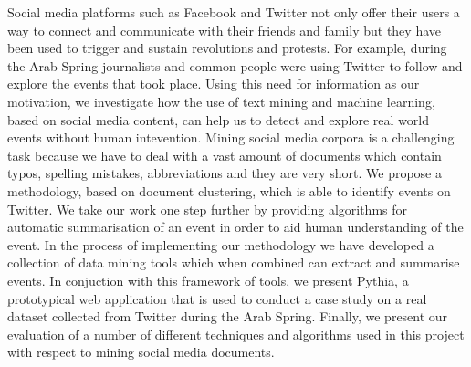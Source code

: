 


\begin{abstracts}        %

Social media platforms such as Facebook and Twitter not only offer their users a way to connect and communicate with their friends and
family but they have been used to trigger and sustain revolutions and protests. For example, during the Arab Spring 
journalists and common people were using Twitter to follow and explore the events that 
took place. Using this need for information as our motivation, we investigate how the use of text mining and machine 
learning, based on social media content, can help us to detect and explore real world events without human intevention. 
Mining social media corpora is a challenging task because we have to deal with a vast amount of 
documents which contain typos, spelling mistakes, abbreviations and they are very short. We propose a methodology, based on document 
clustering, which is able to identify events on Twitter. We take our work one step further by providing algorithms for automatic 
summarisation of an event in order to aid human understanding of the event. In the process of implementing our methodology we have developed a collection 
of data mining tools which when combined can extract and summarise events. In conjuction with this framework of tools, we 
present Pythia, a prototypical web application that is used to conduct a case study on a real dataset collected from 
Twitter during the Arab Spring. Finally, we present our evaluation of a number of different techniques and algorithms 
used in this project with respect to mining social media documents.  


\end{abstracts}




